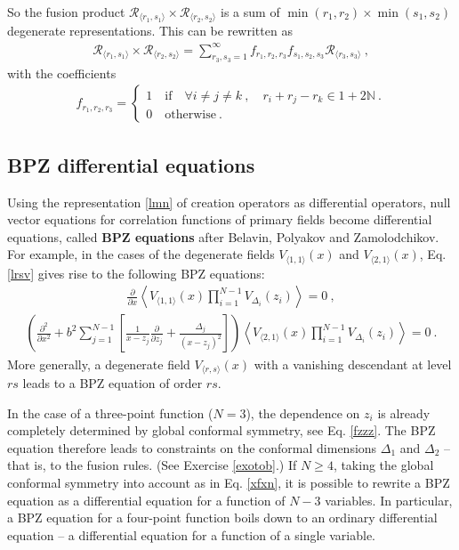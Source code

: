 \documentclass[12pt, a4paper, notitlepage, twoside]{report}
\numberwithin{equation}{section}
\theoremstyle{break}
\begin{document}
So the fusion product $\mathcal{R}_{\langle r_1,s_1 \rangle} \times \mathcal{R}_{\langle r_2,s_2 \rangle}$ is a sum of $\min(r_1,r_2)\times \min(s_1,s_2)$ degenerate representations.
This can be rewritten as 
\begin{align}
\mathcal{R}_{\langle r_1,s_1 \rangle} \times \mathcal{R}_{\langle r_2,s_2 \rangle} = \sum_{r_3,s_3=1}^\infty f_{r_1,r_2,r_3} f_{s_1,s_2,s_3} \mathcal{R}_{\langle r_3,s_3 \rangle}\ ,
 \label{rrrsss}
\end{align}
with the coefficients
\begin{align}
f_{r_1,r_2,r_3} = \left\{\begin{array}{l}  1 \quad \text{if} \quad 
 \forall i\neq j\neq k \ , \quad r_i+r_j-r_k \in 1 + 2{\mathbb{N}}\ .
\\ 0 \quad \text{otherwise} \ .\end{array}\right.  
\label{frrr}
\end{align} 


\subsection{BPZ differential equations \label{secbpz}}

Using the representation \eqref{lmn} of creation operators as differential operators, null vector equations for correlation functions of primary fields become differential equations, called \textbf{\boldmath BPZ equations} after Belavin, Polyakov and Zamolodchikov. 
For example, in the cases of the degenerate fields $V_{\langle 1,1 \rangle}(x)$ and $V_{\langle 2,1 \rangle}(x)$, Eq. \eqref{lrsv} gives rise to the following BPZ equations: 
\begin{align}
 {\frac{\partial}{\partial x}} \left\langle V_{\langle 1,1 \rangle}(x) \prod_{i=1}^{N-1} V_{\Delta_i}(z_i) \right\rangle = 0 \ ,
\label{pvoo} 
\end{align}
\begin{align}
\boxed{\left( \frac{\partial^2}{\partial x^2}  +b^2 \sum_{j=1}^{N-1} \left[\frac{1}{x-z_j}{\frac{\partial}{\partial z_j}}+ \frac{\Delta_j}{(x-z_j)^2} \right]\right)\left\langle V_{\langle 2,1 \rangle}(x) \prod_{i=1}^{N-1} V_{\Delta_i}(z_i) \right\rangle = 0} \ .
\label{pvot}
\end{align}
More generally, a degenerate field $V_{\langle r,s \rangle}(x)$ with a vanishing descendant at level $rs$ leads to a BPZ equation of order $rs$. 

In the case of a three-point function ($N=3$), the dependence on $z_i$ is already completely determined by global conformal symmetry, see Eq. \eqref{fzzz}.
The BPZ equation therefore leads to constraints on the conformal dimensions $\Delta_1$ and $\Delta_2$ -- that is, to the fusion rules. (See Exercise \ref{exotob}.) If $N\geq 4$, taking the global conformal symmetry into account as in Eq. \eqref{xfxn}, it is possible to rewrite a BPZ equation as a differential equation for a function of $N-3$ variables.
In particular, a BPZ equation for a four-point function boils down to an ordinary differential equation -- a differential equation for a function of a single variable.  
\end{document}

